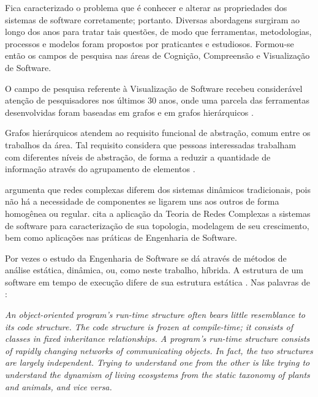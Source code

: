 Fica caracterizado o problema que é conhecer e alterar as propriedades dos
sistemas de software corretamente; portanto.
Diversas abordagens surgiram ao longo dos anos para tratar tais questões, de
modo que ferramentas, metodologias, processos e modelos foram propostos por
praticantes e estudiosos. Formou-se então os campos de pesquisa nas áreas de
Cognição, Compreensão e Visualização de Software.

O campo de pesquisa referente à Visualização de Software recebeu considerável
atenção de pesquisadores nos últimos 30 anos, onde uma parcela das ferramentas
desenvolvidas foram baseadas em grafos \cite{Storey2006:Theories} e em grafos
hierárquicos \cite{Jahnke2002:Visualizations}.

Grafos hierárquicos atendem ao requisito funcional de abstração, comum entre os
trabalhos da área. Tal requisito considera que pessoas interessadas trabalham
com diferentes níveis de abstração, de forma a reduzir a quantidade de
informação através do agrupamento de elementos \cite{Kienle2007:Requirements}.

 argumenta que redes complexas diferem dos
sistemas dinâmicos tradicionais, pois não há a necessidade de componentes se
ligarem uns aos outros de forma homogênea ou regular.
 cita a aplicação da Teoria de Redes Complexas
a sistemas de software para caracterização de sua topologia, modelagem de seu
crescimento, bem como aplicações nas práticas de Engenharia de Software.


Por vezes o estudo da Engenharia de Software se dá através de métodos de análise
estática, dinâmica, ou, como neste trabalho, híbrida.
A estrutura de um software em tempo de execução difere de sua estrutura
estática \cite{Crockford2008:JavaScriptGoodParts}.
Nas palavras de :

\begin{citacao}
\textit{An object-oriented program's run-time structure often bears little
resemblance to its code structure. The code structure is frozen at compile-time;
it consists of classes in fixed inheritance relationships. A program's run-time
structure consists of rapidly changing networks of communicating objects. In
fact, the two structures are largely independent. Trying to understand one from
the other is like trying to understand the dynamism of living ecosystems from
the static taxonomy of plants and animals, and vice versa.}
\end{citacao}

